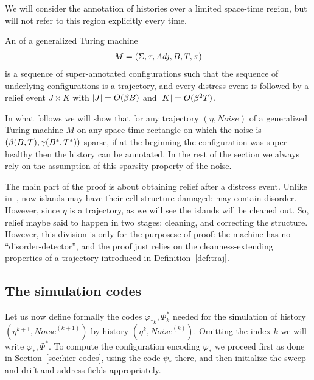 \documentclass[11pt]{memoir}
\theoremstyle{definition} %
\newcommand{\fld}[1]{\ensuremath{\textit{#1\/}}}
\def\B{B}
\newcommand{\Noise}{\mathit{Noise}}
\newcommand{\passno}{\pi}
\newcommand{\Tu}{T}
\newcommand{\Tus}{T^{*}}
\newcommand{\Adj}{\fld{Adj}}
\begin{document}
We will consider the annotation of histories over a limited space-time region, but will
not refer to this region explicitly every time.

\begin{definition}\label{def:annotated-hist}
An  of a generalized Turing machine
    \begin{align*}
        M= (\Sigma, \tau, \Adj,\B, \Tu, \passno)
     \end{align*}
is a sequence of super-annotated configurations such that
the sequence of underlying configurations is a trajectory, and 
every distress event is followed by a relief event \( J\times K \) with 
\( \abs{J}=O(\beta\B) \) and \( \abs{K}= O(\beta^{2}\Tu) \). %
\end{definition}

In what follows we will show that for any trajectory \( (\eta, \Noise) \) of a
generalized Turing machine \( M \) on any space-time rectangle on which the
noise is \( (\beta\pair{\B}{\Tu}, \gamma\pair{\B^{*}}{\Tus}) \)-sparse, if at the
beginning the configuration was super-healthy then the history can be annotated.
In the rest of the section we always rely on the assumption of  this 
sparsity property of the noise.

The main part of the proof is about obtaining relief  after a distress event.
Unlike in~\cite{burstyTuring13}, now islands 
may have their cell structure damaged: may contain disorder.
However, since \( \eta \) is a trajectory, as we will see the islands will be cleaned out.
So, relief maybe said to happen in two stages: cleaning, and correcting the structure.
However, this division is only for the purposese of proof: the machine has no
``disorder-detector'', and the proof just relies on the cleanness-extending properties of a
trajectory introduced in Definition~\ref{def:traj}.


\subsection{The simulation codes}\label{sec:sim-codes}

Let us now define formally the codes \( \varphi_{*k},\Phi_{k}^{*} \) needed
for the simulation of history \( (\eta^{k+1},\Noise^{(k+1)}) \) by history \( (\eta^{k},\Noise^{(k)}) \).
Omitting the index \( k \) we will write \( \varphi_{*},\Phi^{*} \).
To compute the configuration encoding \( \varphi_{*} \) we proceed first as
done in Section~\ref{sec:hier-codes}, using the code \( \psi_{*} \) there,
and then initialize the sweep and drift and address fields appropriately.
\end{document}
